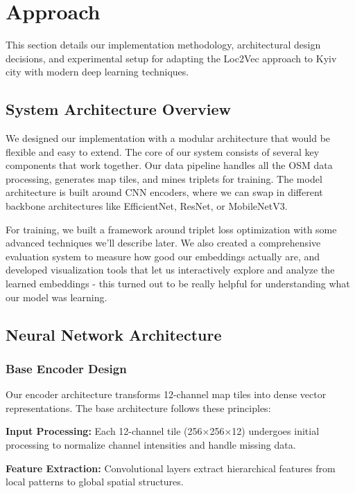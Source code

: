 \section{Approach}
\label{sec:approach}

This section details our implementation methodology, architectural design decisions, and experimental setup for adapting the Loc2Vec approach to Kyiv city with modern deep learning techniques.

\subsection{System Architecture Overview}

We designed our implementation with a modular architecture that would be flexible and easy to extend. The core of our system consists of several key components that work together. Our data pipeline handles all the OSM data processing, generates map tiles, and mines triplets for training. The model architecture is built around CNN encoders, where we can swap in different backbone architectures like EfficientNet, ResNet, or MobileNetV3.

For training, we built a framework around triplet loss optimization with some advanced techniques we'll describe later. We also created a comprehensive evaluation system to measure how good our embeddings actually are, and developed visualization tools that let us interactively explore and analyze the learned embeddings - this turned out to be really helpful for understanding what our model was learning.

\subsection{Neural Network Architecture}

\subsubsection{Base Encoder Design}

Our encoder architecture transforms 12-channel map tiles into dense vector representations. The base architecture follows these principles:

\textbf{Input Processing:} Each 12-channel tile (256×256×12) undergoes initial processing to normalize channel intensities and handle missing data.

\textbf{Feature Extraction:} Convolutional layers extract hierarchical features from local patterns to global spatial structures.

